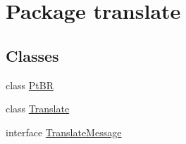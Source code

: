 \hypertarget{namespacetranslate}{}\section{Package translate}
\label{namespacetranslate}
\subsection*{Classes}
\begin{DoxyCompactItemize}
\item 
class \hyperlink{classtranslate_1_1_pt_b_r}{Pt\+BR}
\item 
class \hyperlink{classtranslate_1_1_translate}{Translate}
\item 
interface \hyperlink{interfacetranslate_1_1_translate_message}{Translate\+Message}
\end{DoxyCompactItemize}
